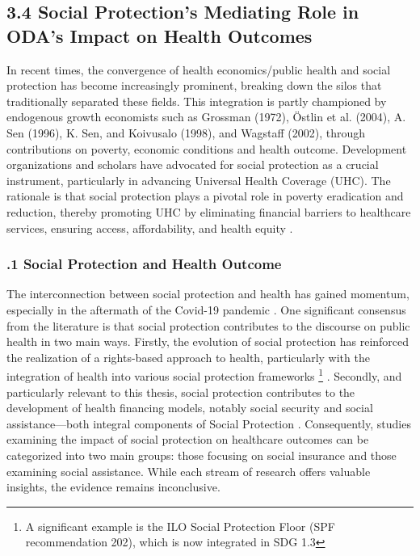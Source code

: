 \subsection*{3.4 Social Protection's Mediating Role in ODA's Impact on Health Outcomes}
In recent times, the convergence of health economics/public health and social protection has become increasingly prominent, breaking down the silos that traditionally separated these fields. This integration is partly championed by endogenous growth economists such as Grossman (1972), Östlin et al. (2004), A. Sen (1996), K. Sen, and Koivusalo (1998), and Wagstaff (2002), through contributions on poverty, economic conditions and health outcome. Development organizations and scholars have advocated for social protection as a crucial instrument, particularly in advancing Universal Health Coverage (UHC). The rationale is that social protection plays a pivotal role in poverty eradication and reduction, thereby promoting UHC by eliminating financial barriers to healthcare services, ensuring access, affordability, and health equity \parencite{fox_clinical_2015, ilo_towards_2020, lonnroth_beyond_2014, siroka_association_2016, world_bank_high-performance_2019, who_world_2010}.

\subsubsection*{.1 Social Protection and Health Outcome}

The interconnection between social protection and health has gained momentum, especially in the aftermath of the Covid-19 pandemic \parencite[see][]{mccord_official_2021, yokobori_roles_2023}. One significant consensus from the literature is that social protection contributes to the discourse on public health in two main ways. Firstly, the evolution of social protection has reinforced the realization of a rights-based approach to health, particularly with the integration of health into various social protection frameworks \footnote{A significant example is the ILO Social Protection Floor (SPF recommendation 202), which is now integrated in SDG 1.3} \parencite[discussion in][]{hagemejer_role_2013, ilo_social_2012, macnaughton_decent_2010, ilo_towards_2020, yokobori_roles_2023}. Secondly, and particularly relevant to this thesis, social protection contributes to the development of health financing models, notably social security and social assistance—both integral components of Social Protection \parencite{scheil-adlung_focusing_2020, scheil-adlung_response_2014, world_bank_high-performance_2019, who_world_2010}. Consequently, studies examining the impact of social protection on healthcare outcomes can be categorized into two main groups: those focusing on social insurance and those examining social assistance. While each stream of research offers valuable insights, the evidence remains inconclusive.

